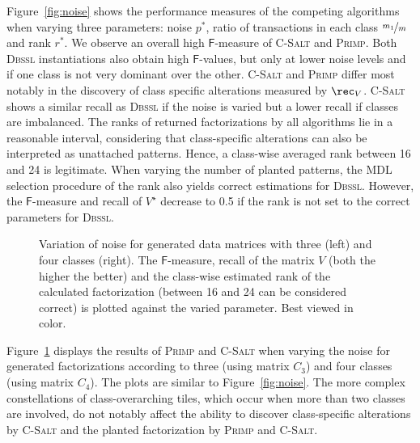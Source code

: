 Figure~\ref{fig:noise} shows the performance measures of the competing algorithms when varying three parameters: noise $p^*$, ratio of transactions in each class $\nicefrac{m_1}{m}$ and rank $r^*$.
We observe an overall high $\mathsf{F}$-measure of \textsc{C-Salt} and \textsc{Primp}.
Both \textsc{Dbssl} instantiations also obtain high $\mathsf{F}$-values, but only at lower noise levels and if one class is not very dominant over the other.
\textsc{C-Salt} and \textsc{Primp} differ most notably in the discovery of class specific alterations measured by $\rec_V$. \textsc{C-Salt} shows a similar recall as \textsc{Dbssl} if the noise is varied but a lower recall if classes are imbalanced. The ranks of returned factorizations by all algorithms lie in a reasonable interval, considering that class-specific alterations can also be interpreted as unattached patterns. Hence, a class-wise averaged rank between 16 and 24 is legitimate. When varying the number of planted patterns, the MDL selection procedure of the rank also yields correct estimations for \textsc{Dbssl}. However, the $\mathsf{F}$-measure and recall of $V^\star$ decrease to 0.5 if the rank is not set to the correct parameters for \textsc{Dbssl}.

\begin{figure}[!t]
\centering

\caption{Variation of noise for generated data matrices with three (left) and four classes (right). The $\mathsf{F}$-measure, recall of the matrix $V$ (both the higher the better) and the class-wise estimated rank of the calculated factorization (between 16 and 24 can be considered correct) is plotted against the varied parameter. Best viewed in color.}
\label{fig:synthClass}
\end{figure}
Figure~\ref{fig:synthClass} displays the results of \textsc{Primp} and \textsc{C-Salt} when varying the noise for generated factorizations according to three (using matrix $C_3$) and four classes (using matrix $C_4$). The plots are similar to Figure~\ref{fig:noise}. The more complex constellations of class-overarching tiles, which occur when more than two classes are involved, do not notably affect the ability to discover class-specific alterations by \textsc{C-Salt} and the planted factorization by \textsc{Primp} and \textsc{C-Salt}.

